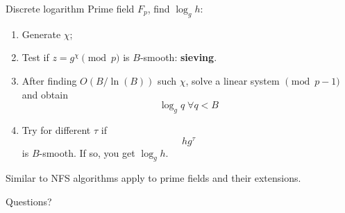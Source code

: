\documentclass[t]{beamer}
\begin{document}
\begin{frame}{Discrete logarithm}
  Prime field $F_p$, find $\log_g h$:
    \begin{enumerate}
    \item Generate $\chi$;
    \item Test if $z=g^{\chi} \pmod{p}$ is $B$-smooth: \textbf{sieving}.
    \item After finding $O(B/\ln(B))$ such $\chi$, solve a linear system $\pmod{p-1}$ and obtain
    $$
    \log_g {q} \;\forall q<B
    $$
    \item Try for different $\tau$ if
    $$
    h g^{\tau}
    $$
    is $B$-smooth. If so, you get $\log_g h$.
\end{enumerate}
Similar to NFS algorithms apply to prime fields and their extensions.
\end{frame}


\begin{frame}[c]
\begin{center}
    \Large{Questions?}
    \end{center}
\end{frame}
\end{document}
